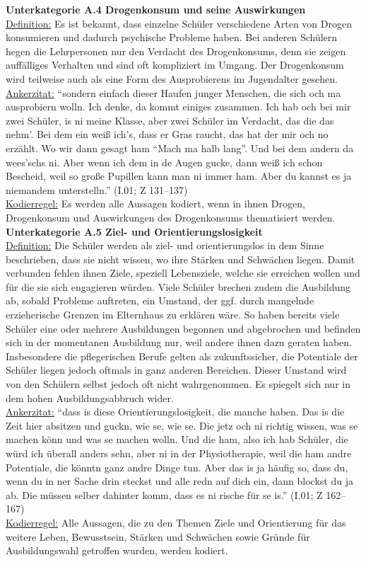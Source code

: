 \noindent
\textbf{Unterkategorie A.4 Drogenkonsum und seine Auswirkungen}\\
\underline{Definition:} Es ist bekannt, dass einzelne Schüler verschiedene Arten von Drogen konsumieren und dadurch psychische Probleme haben. Bei anderen Schülern hegen die Lehrpersonen nur den Verdacht des Drogenkonsums, denn sie zeigen auffälliges Verhalten und sind oft kompliziert im Umgang. Der Drogenkonsum wird teilweise auch als eine Form des Ausprobierens im Jugendalter gesehen.\\
\underline{Ankerzitat:} "`sondern einfach dieser Haufen junger Menschen, die sich och ma ausprobiern wolln. Ich denke, da kommt einiges zusammen. Ich hab och bei mir zwei Schüler, is ni meine Klasse, aber zwei Schüler im Verdacht, das die das nehm'. Bei dem ein weiß ich's, dass er Gras raucht, das hat der mir och no erzählt. Wo wir dann gesagt ham "`Mach ma halb lang"'. Und bei dem andern da wees'schs ni. Aber wenn ich dem in de Augen gucke, dann weiß ich schon Bescheid, weil so große Pupillen kann man ni immer ham. Aber du kannst es ja niemandem unterstelln."' (I.01; Z 131--137)\\
\underline{Kodierregel:} Es werden alle Aussagen kodiert, wenn in ihnen Drogen, Drogenkonsum und Auswirkungen des Drogenkonsums thematisiert werden.\\

\noindent
\textbf{Unterkategorie A.5 Ziel- und Orientierungslosigkeit}\\
\underline{Definition:} Die Schüler werden als ziel- und orientierungslos in dem Sinne beschrieben, dass sie nicht wissen, wo ihre Stärken und Schwächen liegen. Damit verbunden fehlen ihnen Ziele, speziell Lebensziele, welche sie erreichen wollen und für die sie sich engagieren würden. Viele Schüler brechen zudem die Ausbildung ab, sobald Probleme auftreten, ein Umstand, der ggf. durch mangelnde erzieherische Grenzen im Elternhaus zu erklären wäre. So haben bereits viele Schüler eine oder mehrere Ausbildungen begonnen und abgebrochen und befinden sich in der momentanen Ausbildung nur, weil andere ihnen dazu geraten haben. Insbesondere die pflegerischen Berufe gelten als zukunftssicher, die Potentiale der Schüler liegen jedoch oftmals in ganz anderen Bereichen. Dieser Umstand wird von den Schülern selbst jedoch oft nicht wahrgenommen. Es spiegelt sich nur in dem hohen Ausbildungsabbruch wider.\\
\underline{Ankerzitat:} "`dass is diese Orientierungslosigkeit, die manche haben. Das is die Zeit hier absitzen und guckn, wie se, wie se. Die jetz och ni richtig wissen, was se machen könn und was se machen wolln. Und die ham, also ich hab Schüler, die würd ich überall anders sehn, aber ni in der Physiotherapie, weil die ham andre Potentiale, die könntn ganz andre Dinge tun. Aber das is ja häufig so, dass du, wenn du in ner Sache drin steckst und alle redn auf dich ein, dann blockst du ja ab. Die müssen selber dahinter komm, dass es ni rische für se is."' (I.01; Z 162--167)\\
\underline{Kodierregel:} Alle Aussagen, die zu den Themen Ziele und Orientierung für das weitere Leben, Bewusstsein, Stärken und Schwächen sowie Gründe für Ausbildungswahl getroffen wurden, werden kodiert. \\

